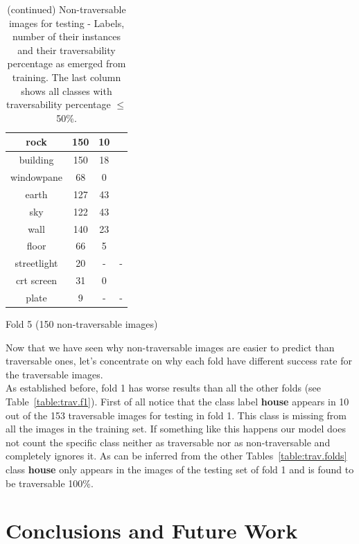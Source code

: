 \documentclass[12pt,a4paper,table,dvipsnames,tikz]{report}
\newcommand{\bl}[1]{{\hypersetup{linkcolor=blue}#1}}
\newcommand{\class}[1]{\textbf{\textcolor{#1}{#1}}} %
\begin{document}
\begin{table}[h!]
\begin{subtable}[h!]{\textwidth}
\begin{tabular}{|c|c|c|c|}
				\hline
				rock & 150 & 10 & \checkmark\\
				\hline
				building & 150 & 18 & \checkmark\\
				\hline
				windowpane & 68 & 0 & \checkmark\\
				\hline
				\rowcolor{earth}
				earth & 127 & 43 & \checkmark\\
				\hline
				\rowcolor{sky}
				sky & 122 & 43 & \checkmark\\
				\hline
				wall & 140 & 23 & \checkmark\\
				\hline
				floor & 66 & 5 & \checkmark\\
				\hline
				streetlight & 20 & - & -\\
				\hline
				crt screen & 31 & 0 & \checkmark\\
				\hline
				plate & 9 & - & -\\
				\hline
			\end{tabular}
			\caption{Fold 5 (150 non-traversable images)}
			\label{table:obst.f5}
		\end{subtable}
		\caption{(continued) Non-traversable images for testing - Labels, number of their instances 
			and their traversability percentage as emerged from training. The last column shows all 
			classes with traversability percentage $\le$ 50\%.}
	\end{table}
	
	
	Now that we have seen why non-traversable images are easier to predict than traversable 
	ones, let's concentrate on why each fold have different success rate for the traversable 
	images.
	\\
		
	As established before, fold 1 has worse results than all the other folds (see 
	Table~\bl{\ref{table:trav.f1}}). First of all notice that the class label \class{house} 
	appears in 10 out of the 153 traversable images for testing in fold 1. This class is 
	missing from all the images in the training set. If something like this happens our 
	model does not count the specific class neither as traversable nor as non-traversable 
	and completely ignores it. As can be inferred from the other Tables~\bl{\ref{table:trav.folds}} 
	class \class{house} only appears in the images of the testing set of fold 1 and is 
	found to be traversable 100\%.
	\\
	
	
	\chapter{Conclusions and Future Work}
	\label{sec:concl}
	
\end{document}

